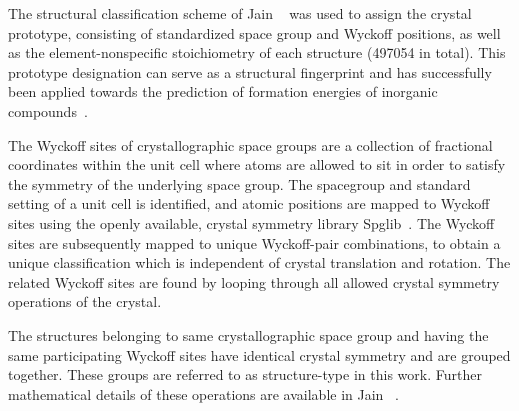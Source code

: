 %
%
The structural classification scheme of Jain ~\cite{Jain2018} was used to assign the crystal prototype,
consisting of standardized space group and Wyckoff positions,
as well as the element-nonspecific stoichiometry of each structure (\num{497054} in total).
%
This prototype designation can serve as a structural fingerprint and has successfully been applied towards the prediction of formation energies of inorganic compounds~\cite{Jain2018}.
%
%

The Wyckoff sites of crystallographic space groups are a collection of fractional coordinates within the unit cell where atoms are allowed to sit in order to satisfy the symmetry of the underlying space group.
%
The spacegroup and standard setting of a unit cell is identified, and atomic positions are mapped to Wyckoff sites using the openly available, crystal symmetry library Spglib~\cite{spglib}. The Wyckoff sites are subsequently mapped to unique Wyckoff-pair combinations, to obtain a unique classification which is independent of crystal translation and rotation. The related Wyckoff sites are found by looping through all allowed crystal symmetry operations of the crystal.


The structures belonging to same crystallographic space group and having the same participating Wyckoff sites have identical crystal symmetry and are grouped together. These groups are referred to as structure-type in this work. Further mathematical details of these operations are available in Jain ~\cite{Jain2018}.


